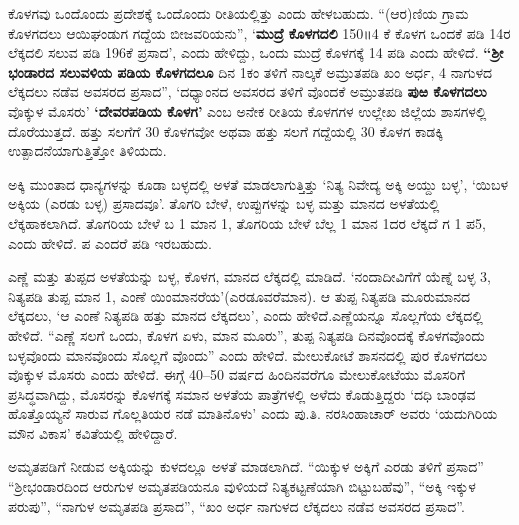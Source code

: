 ಕೊಳಗವು ಒಂದೊಂದು ಪ್ರದೇಶಕ್ಕೆ ಒಂದೊಂದು ರೀತಿಯಲ್ಲಿತ್ತು ಎಂದು ಹೇಳಬಹುದು. “(ಆರ)ಣಿಯ ಗ್ರಾಮ ಕೊಳಗದಲು ಆಯಿಘಂಡುಗ ಗದ್ದೆಯ ಬೀಜವರಿಯನು”, ‘\textbf{ಮುದ್ರೆ ಕೊಳಗದಲಿ} 150॥4 ಕೆ ಕೊಳಗ ಒಂದಕೆ ಪಡಿ 14ರ ಲೆಕ್ಕದಲಿ ಸಲುವ ಪಡಿ 196ಕೆ ಪ್ರಸಾದ’, ಎಂದು ಹೇಳಿದ್ದು, ಒಂದು ಮುದ್ರೆ ಕೊಳಗಕ್ಕೆ 14 ಪಡಿ ಎಂದು ಹೇಳಿದೆ. \textbf{“ಶ‍್ರೀ} \textbf{ಭಂಡಾರದ ಸಲುವಳಿಯ ಪಡಿಯ ಕೊಳಗದಲೂ} ದಿನ 1ಕಂ ತಳಿಗೆ ನಾಲ್ಕಕೆ ಅಮ್ರುತಪಡಿ ಖಂ ಅರ್ಧ, 4 ನಾಗುಳದ ಲೆಕ್ಕದಲು ನಡೆವ ಅವಸರದ ಪ್ರಸಾದ”, ‘ದಧ್ಯಾಂನದ ಅವಸರದ ತಳಿಗೆ ವೊಂದಕೆ ಅಮ್ರುತಪಡಿ \textbf{ಪುಱ ಕೊಳಗದಲು} ವೊಕ್ಕುಳ ಮೊಸರು’ \textbf{‘ದೇವರಪಡಿಯ ಕೊಳಗ’} ಎಂಬ ಅನೇಕ ರೀತಿಯ ಕೊಳಗಗಳ ಉಲ್ಲೇಖ ಜಿಲ್ಲೆಯ ಶಾಸಗಳಲ್ಲಿ ದೊರೆಯುತ್ತದೆ. ಹತ್ತು ಸಲಗೆಗೆ 30 ಕೊಳಗವೋ ಅಥವಾ ಹತ್ತು ಸಲಗೆ ಗದ್ದೆಯಲ್ಲಿ 30 ಕೊಳಗ ಕಾಡಕ್ಕಿ ಉತ್ಪಾದನೆಯಾಗುತ್ತಿತ್ತೋ ತಿಳಿಯದು.

ಅಕ್ಕಿ ಮುಂತಾದ ಧಾನ್ಯಗಳನ್ನು ಕೂಡಾ ಬಳ್ಳದಲ್ಲಿ ಅಳತೆ ಮಾಡಲಾಗುತ್ತಿತ್ತು ‘ನಿತ್ಯ ನಿವೇದ್ಯ ಅಕ್ಕಿ ಅಯ್ದು ಬಳ್ಳ’, ‘ಯಿಬಳ ಅಕ್ಕಿಯ (ಎರಡು ಬಳ್ಳ) ಪ್ರಸಾದವೂ’. ತೊಗರಿ ಬೇಳೆ, ಉಪ್ಪುಗಳನ್ನು ಬಳ್ಳ ಮತ್ತು ಮಾನದ ಅಳತೆಯಲ್ಲಿ ಲೆಕ್ಕಹಾಕಲಾಗಿದೆ. ತೊಗರಿಯ ಬೇಳೆ ಬ 1 ಮಾನ 1, ತೊಗರಿಯ ಬೇಳೆ ಬೆಲ್ಲ 1 ಮಾನ 1ದರ ಲೆಕ್ಕದೆ ಗ 1 ಪ5, ಎಂದು ಹೇಳಿದೆ. ಪ ಎಂದರೆ ಪಡಿ ಇರಬಹುದು.

ಎಣ್ಣೆ ಮತ್ತು ತುಪ್ಪದ ಅಳತೆಯನ್ನು ಬಳ್ಳ, ಕೊಳಗ, ಮಾನದ ಲೆಕ್ಕದಲ್ಲಿ ಮಾಡಿದೆ. ‘ನಂದಾದೀವಿಗೆಗೆ ಯೆಣ್ನೆ ಬಳ್ಳ 3, ನಿತ್ಯಪಡಿ ತುಪ್ಪ ಮಾನ 1, ಎಂಣೆ ಯಿಂಮಾನರೆಯ’(ಎರಡೂವರೆಮಾನ). ಆ ತುಪ್ಪ ನಿತ್ಯಪಡಿ ಮೂರುಮಾನದ ಲೆಕ್ಕದಲು, ‘ಆ ಎಂಣೆ ನಿತ್ಯಪಡಿ ಹತ್ತು ಮಾನದ ಲೆಕ್ಕದಲು’, ಎಂದು ಹೇಳಿದೆ.ಎಣ್ಣೆಯನ್ನೂ ಸೊಲ್ಲಗೆಯ ಲೆಕ್ಕದಲ್ಲಿ ಹೇಳಿದೆ. “ಎಣ್ಣೆ ಸಲಗೆ ಒಂದು, ಕೊಳಗ ಏಳು, ಮಾನ ಮೂರು”, ತುಪ್ಪ ನಿತ್ಯಪಡಿ ದಿನವೊಂದಕ್ಕೆ ಕೊಳಗವೊಂದು ಬಳ್ಳವೊಂದು ಮಾನವೊಂದು ಸೊಲ್ಲಗೆ ವೊಂದು” ಎಂದು ಹೇಳಿದೆ. ಮೇಲುಕೋಟೆ ಶಾಸನದಲ್ಲಿ ಪುರ ಕೊಳಗದಲು ವೊಕ್ಕುಳ ಮೊಸರು ಎಂದು ಹೇಳಿದೆ. ಈಗ್ಗೆ 40–50 ವರ್ಷದ ಹಿಂದಿನವರೆಗೂ ಮೇಲುಕೋಟೆಯು ಮೊಸರಿಗೆ ಪ್ರಸಿದ್ಧವಾಗಿದ್ದು, ಮೊಸರನ್ನು ಕೊಳಗಕ್ಕೆ ಸಮಾನ ಅಳತೆಯ ಪಾತ್ರೆಗಳಲ್ಲಿ ಅಳೆದು ಕೊಡುತ್ತಿದ್ದರು ‘ದಧಿ ಬಾಂಢವ ಹೊತ್ತೊಯ್ಯನೆ ಸಾರುವ ಗೊಲ್ಲತಿಯರ ನಡೆ ಮಾತಿನೊಳು’ ಎಂದು ಪು.ತಿ. ನರಸಿಂಹಾಚಾರ್ ಅವರು ‘ಯದುಗಿರಿಯ ಮೌನ ವಿಕಾಸ’ ಕವಿತೆಯಲ್ಲಿ ಹೇಳಿದ್ದಾರೆ.

ಅಮೃತಪಡಿಗೆ ನೀಡುವ ಅಕ್ಕಿಯನ್ನು ಕುಳದಲ್ಲೂ ಅಳತೆ ಮಾಡಲಾಗಿದೆ. “ಯಿಕ್ಕುಳ ಅಕ್ಕಿಗೆ ಎರಡು ತಳಿಗೆ ಪ್ರಸಾದ” “ಶ‍್ರೀಭಂಡಾರದಿಂದ ಆರುಗುಳ ಅಮೃತಪಡಿಯನೂ ವುಳಿಯದೆ ನಿತ್ಯಕಟ್ಟಣೆಯಾಗಿ ಬಿಟ್ಟುಬಹೆವು”, “ಅಕ್ಕಿ ಇಕ್ಕುಳ ಪರುಪು”, “ನಾಗುಳ ಅಮೃತಪಡಿ ಪ್ರಸಾದ”, “ಖಂ ಅರ್ಧ ನಾಗುಳದ ಲೆಕ್ಕದಲು ನಡೆವ ಅವಸರದ ಪ್ರಸಾದ”.

